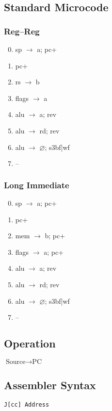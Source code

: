\documentclass[11pt]{book}
\newcommand*{\instruction}[2][]{%
  \clearpage
  \thispagestyle{fancy}%
  \fancyhf[HL,HR]{\huge{#2}}%
  \fancyhf[HC]{#1}\addtocounter{section}{1}\noindent
}
\let\emptyset\varnothing
\begin{document}
\subsection*{Standard Microcode}
\begin{multicols}{2}\ttfamily\selectfont\small
  \subsubsection*{Reg--Reg}
  \begin{enumerate}\setcounter{enumi}{-1}
  \item sp \(\rightarrow\) a; pc+
  \item pc+
  \item rs \(\rightarrow\) b
  \item flags \(\rightarrow\) a
  \item alu \(\rightarrow\) a; rev
  \item alu \(\rightarrow\) rd; rev
  \item alu \(\rightarrow\) \(\emptyset\); s3bf|wf
  \item --
  \end{enumerate}
  \columnbreak
  \subsubsection*{Long Immediate}
  \begin{enumerate}\setcounter{enumi}{-1}
  \item sp \(\rightarrow\) a; pc+
  \item pc+
  \item mem \(\rightarrow\) b; pc+
  \item flags \(\rightarrow\) a; pc+
  \item alu \(\rightarrow\) a; rev
  \item alu \(\rightarrow\) rd; rev
  \item alu \(\rightarrow\) \(\emptyset\); s3bf|wf
  \item --
  \end{enumerate}
\end{multicols}


\instruction[Jump]{J}
\subsection*{Operation}
\(\text{Source}\rightarrow\text{PC}\)

\subsection*{Assembler Syntax}
\texttt{J[cc] Address}
\end{document}
